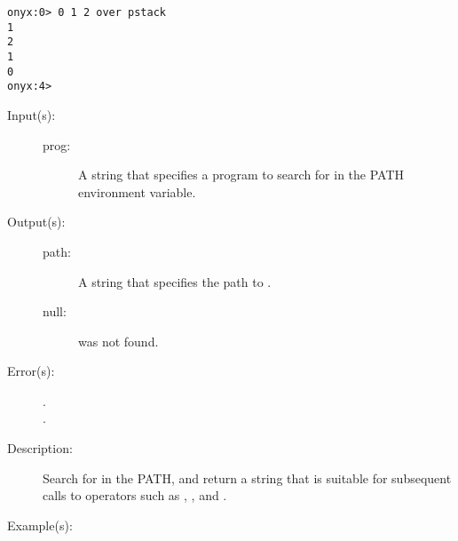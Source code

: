 \begin{description}
\begin{description}
\begin{verbatim}
onyx:0> 0 1 2 over pstack
1
2
1
0
onyx:4>
		\end{verbatim}
	\end{description}
\label{systemdict:path}
\item[{\onyxop{prog}{path}{path/null}}: ]
	\begin{description}\item[]
	\item[Input(s): ]
		\begin{description}\item[]
		\item[prog: ]
			A string that specifies a program to search for in the
			PATH environment variable.
		\end{description}
	\item[Output(s): ]
		\begin{description}\item[]
		\item[path: ]
			A string that specifies the path to .
		\item[null: ]
			 was not found.
		\end{description}
	\item[Error(s): ]
		\begin{description}\item[]
		\item[.]
		\item[.]
		\end{description}
	\item[Description: ]
		Search for  in the PATH, and return a string that is
		suitable for subsequent calls to operators such as
		,
		, and
		.
	\item[Example(s): ]\begin{verbatim}


\end{verbatim}
\end{description}
\end{description}

